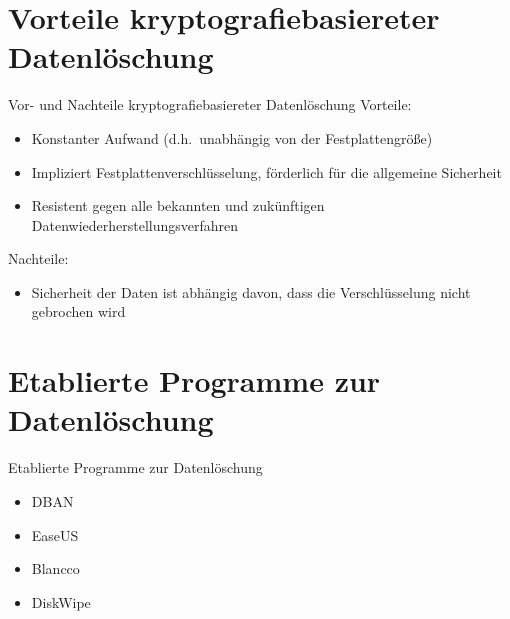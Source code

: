 \documentclass{beamer}
\begin{document}
\section{Vorteile kryptografiebasiereter Datenlöschung}
\begin{frame}{Vor- und Nachteile kryptografiebasiereter Datenlöschung}
	\large{Vorteile:}
	\begin{itemize}
		\item Konstanter Aufwand (d.h.\ unabhängig von der Festplattengröße)
		\item Impliziert Festplattenverschlüsselung, förderlich für die
			allgemeine Sicherheit
		\item Resistent gegen alle bekannten und zukünftigen
			Datenwiederherstellungsverfahren
	\end{itemize}

	\large{Nachteile:}
	
	\begin{itemize}
		\item Sicherheit der Daten ist abhängig davon, dass die Verschlüsselung
			nicht gebrochen wird
	\end{itemize}
\end{frame}

\section{Etablierte Programme zur Datenlöschung}
\begin{frame}{Etablierte Programme zur Datenlöschung}
	\begin{itemize}
		\item DBAN
		\item EaseUS
		\item Blancco
		\item DiskWipe
	\end{itemize}
\end{frame}
\end{document}
